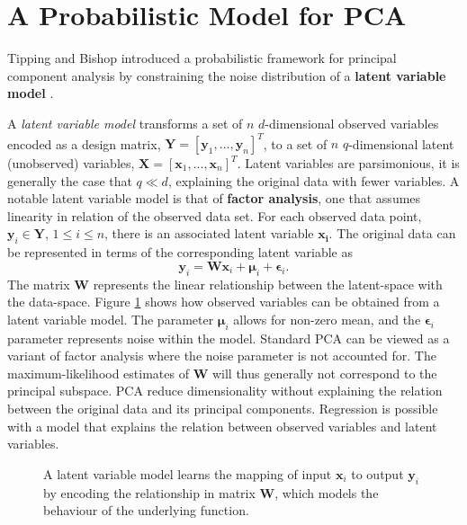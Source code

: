 \documentclass[ %
author={Dillon Keith Diep},
supervisor={Dr. Carl Henrik Ek},
degree={MEng},
title={ART-CG Hair:},
subtitle={Assisted Real-time Content Generation of Stylised Virtual Hair},
type={Research},
year={2017} ]{dissertation}
\begin{document}
\section{A Probabilistic Model for PCA}
Tipping and Bishop introduced a probabilistic framework for principal component analysis by constraining the noise distribution of a \textbf{latent variable model} \cite{ppca}.

A \textit{latent variable model} transforms a set of $n$ $d$-dimensional observed variables encoded as a design matrix, $\bm{Y}=[\bm{y}_1,...,\bm{y}_n]^T$, to a set of $n$ $q$-dimensional latent (unobserved) variables, $\bm{X}=[\bm{x}_1,...,\bm{x}_n]^T$. Latent variables are parsimonious, it is generally the case that $q \ll d$, explaining the original data with fewer variables. A notable latent variable model is that of \textbf{factor analysis}, one that assumes linearity in relation of the observed data set.
For each observed data point, $\bm{y}_i \in \bm{Y}$, $1 \leq i \leq n $, there is an associated latent variable $\bm{x_i}$. The original data can be represented in terms of the corresponding latent variable as
\begin{equation} \label{ppca:fa}
\bm{y}_i=\bm{Wx}_i+\bm{\mu}_i+\bm{\epsilon}_i.
\end{equation}
The matrix $\bm{W}$ represents the linear relationship between the latent-space with the data-space. Figure \ref{lvm} shows how observed variables can be obtained from a latent variable model.
The parameter $\bm{\mu}_i$ allows for non-zero mean, and the $\bm{\epsilon}_i$ parameter represents noise within the model. Standard PCA can be viewed as a variant of factor analysis where the noise parameter is not accounted for. The maximum-likelihood estimates of $\bm{W}$ will thus generally not correspond to the principal subspace. PCA reduce dimensionality without explaining the relation between the original data and its principal components. Regression is possible with a model that explains the relation between observed variables and latent variables.

\begin{figure}[!h]
	\centering
	\caption{A latent variable model learns the mapping of input $\bm{x}_i$ to output $\bm{y}_i$ by encoding the relationship in matrix $\bm{W}$, which models the behaviour of the underlying function.}
	\vspace{0.1cm}
	\label{lvm}
\end{figure} 
\end{document}
